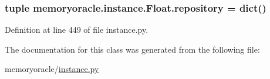 \subsubsection[{repository}]{\setlength{\rightskip}{0pt plus 5cm}tuple memoryoracle.\+instance.\+Float.\+repository = dict()\hspace{0.3cm}{\ttfamily [static]}}\label{classmemoryoracle_1_1instance_1_1Float_a95b3997824e3c9223128f07ef7c69a19}


Definition at line 449 of file instance.\+py.



The documentation for this class was generated from the following file\+:\begin{DoxyCompactItemize}
\item 
memoryoracle/\hyperlink{instance_8py}{instance.\+py}\end{DoxyCompactItemize}
